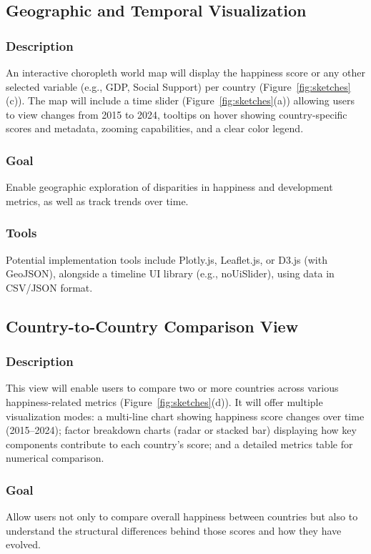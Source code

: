 \documentclass[10pt,conference,compsocconf]{IEEEtran}
\begin{document}
\subsection{Geographic and Temporal Visualization}
\subsubsection{Description}
An interactive choropleth world map will display the happiness score or any other selected variable (e.g., GDP, Social Support) per country (Figure~\ref{fig:sketches}(c)). The map will include a time slider (Figure~\ref{fig:sketches}(a)) allowing users to view changes from 2015 to 2024, tooltips on hover showing country-specific scores and metadata, zooming capabilities, and a clear color legend.
\subsubsection{Goal}
Enable geographic exploration of disparities in happiness and development metrics, as well as track trends over time.
\subsubsection{Tools}
Potential implementation tools include Plotly.js, Leaflet.js, or D3.js (with GeoJSON), alongside a timeline UI library (e.g., noUiSlider), using data in CSV/JSON format.

\subsection{Country-to-Country Comparison View}
\subsubsection{Description}
This view will enable users to compare two or more countries across various happiness-related metrics (Figure~\ref{fig:sketches}(d)). It will offer multiple visualization modes: a multi-line chart showing happiness score changes over time (2015--2024); factor breakdown charts (radar or stacked bar) displaying how key components contribute to each country's score; and a detailed metrics table for numerical comparison.
\subsubsection{Goal}
Allow users not only to compare overall happiness between countries but also to understand the structural differences behind those scores and how they have evolved.
\end{document}
